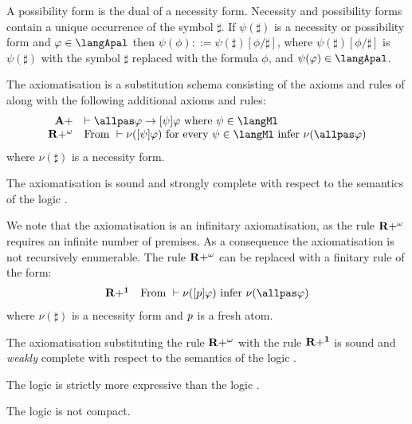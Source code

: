 A possibility form is the dual of a necessity form.
Necessity and possibility forms contain a unique occurrence of the symbol $\sharp$.
If $\psi(\sharp)$ is a necessity or possibility form and $\phi \in \langApal$ then $\psi(\phi) ::= \psi(\sharp)[\phi/\sharp]$, where $\psi(\sharp)[\phi/\sharp]$ is $\psi(\sharp)$ with the symbol $\sharp$ replaced with the formula $\phi$, and $\psi(\phi) \in \langApal$.

\begin{definition}
The axiomatisation \axiomApalS{} is a substitution schema consisting of the axioms and rules of \axiomPalS{} along with the following additional axioms and rules:
$$
\begin{array}{rl}
    {\bf A+} & \proves \allpas \phi \implies \announceA{\psi} \phi \text{ where } \psi  \in \langMl\\
    {\bf R+^\omega} & \text{From } \proves \nu(\announceA{\psi} \phi) \text{ for every } \psi \in \langMl \text{ infer } \nu(\allpas \phi)
\end{array}
$$
where $\nu(\sharp)$ is a necessity form.
\end{definition}

\begin{proposition}
The axiomatisation \axiomApalS{} is sound and strongly complete with respect to the semantics of the logic \logicApalS{}.
\end{proposition}

We note that the axiomatisation \axiomApalS{} is an infinitary axiomatisation, as the rule ${\bf R+^\omega}$ requires an infinite number of premises.
As a consequence the axiomatisation is not recursively enumerable.
The rule ${\bf R+^\omega}$ can be replaced with a finitary rule of the form:
$$
\begin{array}{rl}
    {\bf R+^1} & \text{From } \proves \nu(\announceA{\atomP} \phi) \text{ infer } \nu(\allpas \phi)
\end{array}
$$
where $\nu(\sharp)$ is a necessity form and $p$ is a fresh atom.

\begin{proposition}
The axiomatisation \axiomApalS{} substituting the rule ${\bf R+^\omega}$ with the rule ${\bf R+^1}$ is sound and {\em weakly} complete with respect to the semantics of the logic \logicApalS{}.
\end{proposition}

\begin{proposition}
The logic \logicApalS{} is strictly more expressive than the logic \logicPalS{}.
\end{proposition}

\begin{proposition}
The logic \logicApalS{} is not compact.
\end{proposition}
